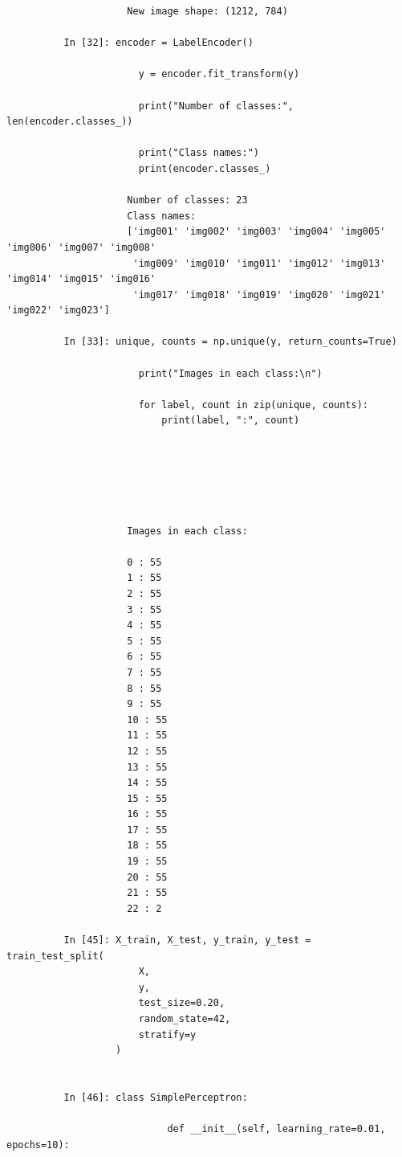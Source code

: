 \documentclass[12pt,a4paper]{article}
\begin{document}
\begin{lstlisting}
                     New image shape: (1212, 784)

          In [32]: encoder = LabelEncoder()

                       y = encoder.fit_transform(y)

                       print("Number of classes:", len(encoder.classes_))

                       print("Class names:")
                       print(encoder.classes_)

                     Number of classes: 23
                     Class names:
                     ['img001' 'img002' 'img003' 'img004' 'img005' 'img006' 'img007' 'img008'
                      'img009' 'img010' 'img011' 'img012' 'img013' 'img014' 'img015' 'img016'
                      'img017' 'img018' 'img019' 'img020' 'img021' 'img022' 'img023']

          In [33]: unique, counts = np.unique(y, return_counts=True)

                       print("Images in each class:\n")

                       for label, count in zip(unique, counts):
                           print(label, ":", count)






                     Images in each class:

                     0 : 55
                     1 : 55
                     2 : 55
                     3 : 55
                     4 : 55
                     5 : 55
                     6 : 55
                     7 : 55
                     8 : 55
                     9 : 55
                     10 : 55
                     11 : 55
                     12 : 55
                     13 : 55
                     14 : 55
                     15 : 55
                     16 : 55
                     17 : 55
                     18 : 55
                     19 : 55
                     20 : 55
                     21 : 55
                     22 : 2

          In [45]: X_train, X_test, y_train, y_test = train_test_split(
                       X,
                       y,
                       test_size=0.20,
                       random_state=42,
                       stratify=y
                   )


          In [46]: class SimplePerceptron:

                            def __init__(self, learning_rate=0.01, epochs=10):


\end{lstlisting}
\end{document}
